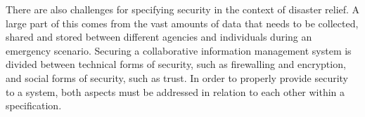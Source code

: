 \documentclass[sigconf,nonacm]{acmart}%
\begin{document}
	There are also challenges for specifying security in the context of disaster relief. A large part of this comes from the vast amounts of data that needs to be collected, shared and stored between different agencies and individuals during an emergency scenario. Securing a collaborative information management system is divided between technical forms of security, such as firewalling and encryption, and social forms of security, such as trust. In order to properly provide security to a system, both aspects must be addressed in relation to each other within a specification. 	
	
	
\end{document}
